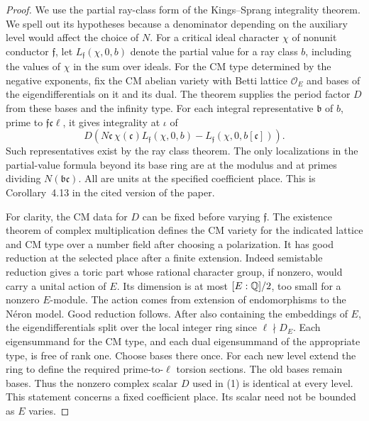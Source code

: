 \documentclass[a4paper,11pt]{article}
\theoremstyle{definition}
\theoremstyle{remark}
\numberwithin{equation}{section}
\begin{document}
\begin{proof}
We use the partial ray-class form of the Kings--Sprang integrality
theorem. We spell out its hypotheses because a denominator depending
on the auxiliary level would affect the choice of \(N\).
For a critical ideal character \(\chi\) of nonunit conductor
\(\mathfrak f\), let \(L_{\mathfrak f}(\chi,0,b)\) denote the partial
value for a ray class \(b\), including the values of \(\chi\) in
the sum over ideals. For the CM type determined by the negative
exponents, fix the CM abelian variety with Betti lattice
\(\mathcal O_E\) and bases of the eigendifferentials on it and its
dual. The theorem supplies the period factor \(D\) from these
bases and the infinity type. For each integral representative
\(\mathfrak b\) of \(b\), prime to \(\mathfrak f\mathfrak c\ell\),
it gives integrality at \(\iota\) of
\[
 D\left(N\mathfrak c\,\chi(\mathfrak c)
           L_{\mathfrak f}(\chi,0,b)
          -L_{\mathfrak f}(\chi,0,b[\mathfrak c])\right).
 \tag{1}\label{eq:partialcm731}
\]
Such representatives exist by the ray class theorem. The only
localizations in the partial-value formula beyond its base ring
are at the modulus and at primes dividing
\(N(\mathfrak b\mathfrak c)\). All are units at the specified
coefficient place. This is Corollary~4.13 in the cited version
of the paper. \cite{II-II-kingssprang731}

For clarity, the CM data for \(D\) can be fixed before varying
\(\mathfrak f\). The existence theorem of complex multiplication
defines the CM variety for the indicated lattice and CM type over
a number field after choosing a polarization. It has good reduction
at the selected place after a finite extension. Indeed semistable
reduction gives a toric part whose rational character group, if
nonzero, would carry a unital action of \(E\). Its dimension is at
most \([E:\mathbb Q]/2\), too small for a nonzero \(E\)-module. The action
comes from extension of endomorphisms to the Néron model. Good
reduction follows. After also containing the embeddings of \(E\),
the eigendifferentials split over the local integer ring since
\(\ell\nmid D_E\). Each eigensummand for the CM type, and each
dual eigensummand of the appropriate type, is free of rank one.
Choose bases there once. For each new level extend the ring to
define the required prime-to-\(\ell\) torsion sections. The old
bases remain bases. Thus the nonzero complex scalar \(D\) used in
(1) is identical at every level. This statement concerns a fixed
coefficient place. Its scalar need not be bounded as \(E\) varies.


\end{proof}
\end{document}
